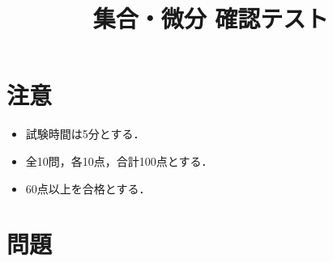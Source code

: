\documentclass[uplatex,a4paper,12pt]{jsarticle}
\begin{document}
\title{集合・微分 確認テスト}
\author{}
\date{}
\maketitle

\section*{注意}
\begin{itemize}
\item 試験時間は5分とする．
\item 全10問，各10点，合計100点とする．
\item 60点以上を合格とする．
\end{itemize}

\section*{問題}
\end{document}
